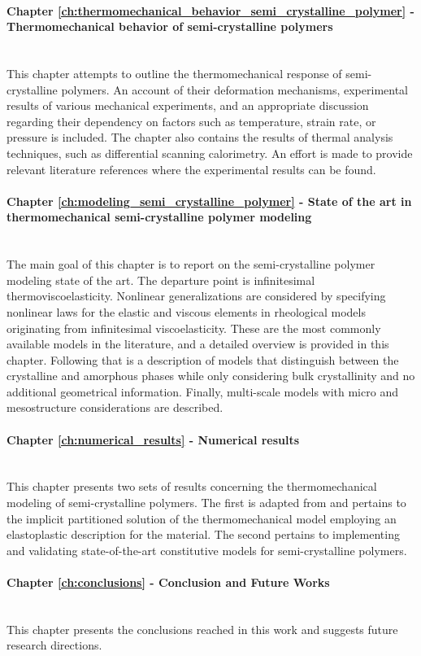 \paragraph{Chapter \ref{ch:thermomechanical_behavior_semi_crystalline_polymer} - Thermomechanical behavior of semi-crystalline polymers}\mbox{}\\
This chapter attempts to outline the thermomechanical response of semi-crystalline polymers.
An account of their deformation mechanisms, experimental results of various mechanical experiments, and an appropriate discussion regarding their dependency on factors such as temperature, strain rate, or pressure is included.
The chapter also contains the results of thermal analysis techniques, such as differential scanning calorimetry.
An effort is made to provide relevant literature references where the experimental results can be found.

\paragraph{Chapter \ref{ch:modeling_semi_crystalline_polymer} - State of the art in thermomechanical semi-crystalline polymer modeling}\mbox{}\\
The main goal of this chapter is to report on the semi-crystalline polymer modeling state of the art.
The departure point is infinitesimal thermoviscoelasticity.
Nonlinear generalizations are considered by specifying nonlinear laws for the elastic and viscous elements in rheological models originating from infinitesimal viscoelasticity.
These are the most commonly available models in the literature, and a detailed overview is provided in this chapter.
Following that is a description of models that distinguish between the crystalline and amorphous phases while only considering bulk crystallinity and no additional geometrical information.
Finally, multi-scale models with micro and mesostructure considerations are described.

\paragraph{Chapter \ref{ch:numerical_results} - Numerical results}\mbox{}\\
This chapter presents two sets of results concerning the thermomechanical modeling of semi-crystalline polymers.
The first is adapted from \cite{vila-chaNumericalAssessmentPartitioned2023a} and pertains to the implicit partitioned solution of the thermomechanical model employing an elastoplastic description for the material.
The second pertains to implementing and validating state-of-the-art constitutive models for semi-crystalline polymers.

\paragraph{Chapter \ref{ch:conclusions} - Conclusion and Future Works}\mbox{} \\
This chapter presents the conclusions reached in this work and suggests future research directions.
